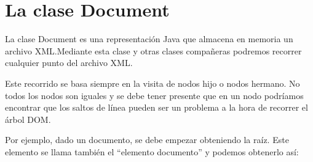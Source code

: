 \documentclass[letterpaper,10pt,spanish]{sphinxmanual}
\begin{document}
\section{La clase Document}
\label{\detokenize{tema6:la-clase-document}}
La clase Document es una representación Java que almacena en memoria un archivo XML.Mediante esta clase y otras clases compañeras podremos recorrer cualquier punto del archivo XML.

Este recorrido se basa siempre en la visita de nodos hijo o nodos hermano. No todos los nodos son iguales y se debe tener presente que en un nodo podríamos encontrar que los saltos de línea pueden ser un problema a la hora de recorrer el árbol DOM.

Por ejemplo, dado un documento, se debe empezar obteniendo la raíz. Este elemento se llama también el “elemento documento” y podemos obtenerlo así:

\begin{sphinxVerbatim}[commandchars=\\\{\}]
 
\end{sphinxVerbatim}
\end{document}

